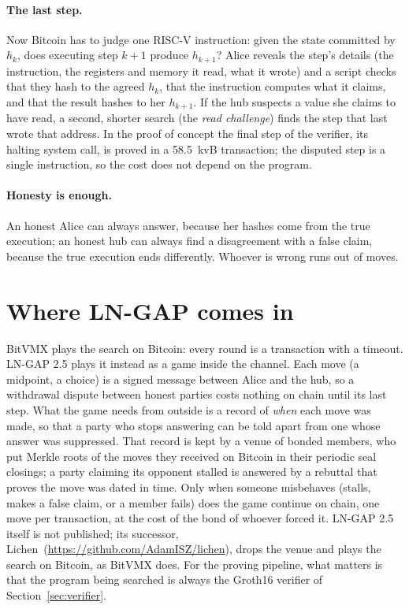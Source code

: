 \documentclass[11pt]{article}
\begin{document}
\paragraph{The last step.} Now Bitcoin has to judge one RISC-V
instruction: given the state committed by $h_k$, does executing step
$k+1$ produce $h_{k+1}$? Alice reveals the step's details (the
instruction, the registers and memory it read, what it wrote) and a
script checks that they hash to the agreed $h_k$, that the instruction
computes what it claims, and that the result hashes to her $h_{k+1}$. If
the hub suspects a value she claims to have read, a second, shorter
search (the \emph{read challenge}) finds the step that last wrote that
address. In the proof of concept the final step of the verifier, its
halting system call, is proved in a 58.5~kvB transaction; the
disputed step is a single instruction, so the cost does not depend on
the program.

\paragraph{Honesty is enough.} An honest Alice can always answer, because
her hashes come from the true execution; an honest hub can always find a
disagreement with a false claim, because the true execution ends
differently. Whoever is wrong runs out of moves.

\section{Where LN-GAP comes in}
\label{sec:lngap}

BitVMX plays the search on Bitcoin: every round is a transaction with a
timeout. LN-GAP 2.5 plays it instead as a game inside the channel. Each
move (a midpoint, a choice) is a signed message between Alice and the
hub, so a withdrawal dispute between honest parties costs nothing on
chain until its last step. What the game needs from outside is a record
of \emph{when} each move was made, so that a party who stops answering
can be told apart from one whose answer was suppressed. That record is
kept by a venue of bonded members, who put Merkle roots of the moves
they received on Bitcoin in their periodic seal closings; a party
claiming its opponent stalled is answered by a rebuttal that proves the
move was dated in time. Only when someone misbehaves (stalls, makes a
false claim, or a member fails) does the game continue on chain, one
move per transaction, at the cost of the bond of whoever forced it.
LN-GAP 2.5 itself is not published; its successor,
Lichen~(\url{https://github.com/AdamISZ/lichen}), drops the venue and
plays the search on Bitcoin, as BitVMX does. For the proving pipeline,
what matters is that the program being searched is always the Groth16
verifier of Section~\ref{sec:verifier}.
\end{document}
